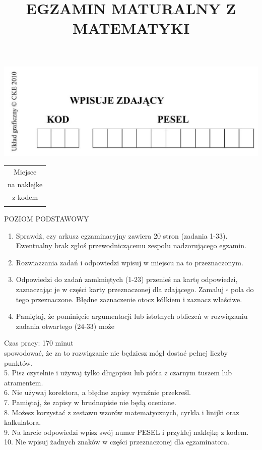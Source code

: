 \documentclass[10pt]{article}
\title{EGZAMIN MATURALNY Z MATEMATYKI }
\author{}
\date{}
\begin{document}
\maketitle
\begin{center}
\includegraphics[max width=\textwidth]{2024_11_21_5b6b7ffa9006e3f448adg-01(1)}
\end{center}

\begin{center}
\begin{tabular}{c|}
\hline
Miejsce \\
na naklejke \\
z kodem \\
 \\
\hline
\end{tabular}
\end{center}

POZIOM PODSTAWOWY

\begin{enumerate}
  \item Sprawdź, czy arkusz egzaminacyjny zawiera 20 stron (zadania 1-33). Ewentualny brak zgłoś przewodniczącemu zespołu nadzorującego egzamin.
  \item Rozwiazzania zadań i odpowiedzi wpisuj w miejscu na to przeznaczonym.
  \item Odpowiedzi do zadań zamkniętych (1-23) przenieś na kartę odpowiedzi, zaznaczając je w części karty przeznaczonej dla zdającego. Zamaluj \(\square\) pola do tego przeznaczone. Błędne zaznaczenie otocz kółkiem i zaznacz właściwe.
  \item Pamiętaj, że pominięcie argumentacji lub istotnych obliczeń w rozwiązaniu zadania otwartego (24-33) może
\end{enumerate}

Czas pracy: 170 minut\\
spowodować, że za to rozwiązanie nie będziesz mógł dostać pełnej liczby punktów.\\
5. Pisz czytelnie i używaj tylko długopisu lub pióra z czarnym tuszem lub atramentem.\\
6. Nie używaj korektora, a błędne zapisy wyraźnie przekreśl.\\
7. Pamiętaj, że zapisy w brudnopisie nie będą oceniane.\\
8. Możesz korzystać z zestawu wzorów matematycznych, cyrkla i linijki oraz kalkulatora.\\
9. Na karcie odpowiedzi wpisz swój numer PESEL i przyklej naklejkę z kodem.\\
10. Nie wpisuj żadnych znaków w części przeznaczonej dla egzaminatora.
\end{document}
